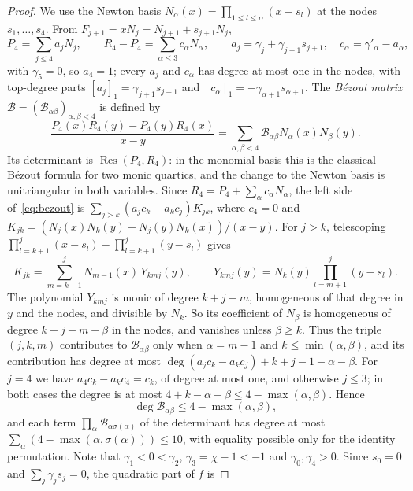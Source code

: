 \documentclass[11pt]{article}
\theoremstyle{definition}
\theoremstyle{remark}
\begin{document}
\begin{proof}
We use the Newton basis $N_\alpha(x)=\prod_{1\le l\le\alpha}(x-s_l)$ at the
nodes $s_1,\dots,s_4$. From $F_{j+1}=xN_j=N_{j+1}+s_{j+1}N_j$,
\[
 P_4=\sum_{j\le4}a_jN_j,\qquad R_4-P_4=\sum_{\alpha\le3}c_\alpha N_\alpha,\qquad
 a_j=\gamma_j+\gamma_{j+1}s_{j+1},\quad c_\alpha=\gamma'_\alpha-a_\alpha,
\]
with $\gamma_5=0$, so $a_4=1$; every $a_j$ and $c_\alpha$ has degree at most one
in the nodes, with top-degree parts $[a_j]_1=\gamma_{j+1}s_{j+1}$ and
$[c_\alpha]_1=-\gamma_{\alpha+1}s_{\alpha+1}$. The \emph{B\'ezout matrix}
$\mathcal B=(\mathcal B_{\alpha\beta})_{\alpha,\beta<4}$ is defined by
\begin{equation}\label{eq:bezout}
 \frac{P_4(x)R_4(y)-P_4(y)R_4(x)}{x-y}
 =\sum_{\alpha,\beta<4}\mathcal B_{\alpha\beta}N_\alpha(x)N_\beta(y).
\end{equation}
Its determinant is $\operatorname{Res}(P_4,R_4)$: in the monomial basis this is
the classical B\'ezout formula for two monic quartics, and the change to the
Newton basis is unitriangular in both variables. Since
$R_4=P_4+\sum_\alpha c_\alpha N_\alpha$, the left side of~\eqref{eq:bezout} is
$\sum_{j>k}(a_jc_k-a_kc_j)K_{jk}$, where $c_4=0$ and
$K_{jk}=(N_j(x)N_k(y)-N_j(y)N_k(x))/(x-y)$. For $j>k$, telescoping
$\prod_{l=k+1}^j(x-s_l)-\prod_{l=k+1}^j(y-s_l)$ gives
\begin{equation}\label{eq:bezoutK}
 K_{jk}=\sum_{m=k+1}^{j}N_{m-1}(x)\,Y_{kmj}(y),\qquad
 Y_{kmj}(y)=N_k(y)\prod_{l=m+1}^{j}(y-s_l).
\end{equation}
The polynomial $Y_{kmj}$ is monic of degree $k+j-m$, homogeneous of that degree
in $y$ and the nodes, and divisible by $N_k$. So its coefficient of $N_\beta$
is homogeneous of degree $k+j-m-\beta$ in the nodes, and vanishes unless
$\beta\ge k$. Thus the triple $(j,k,m)$ contributes to $\mathcal B_{\alpha\beta}$
only when $\alpha=m-1$ and $k\le\min(\alpha,\beta)$, and its contribution has
degree at most $\deg(a_jc_k-a_kc_j)+k+j-1-\alpha-\beta$. For $j=4$ we have
$a_4c_k-a_kc_4=c_k$, of degree at most one, and otherwise $j\le3$; in both cases
the degree is at most $4+k-\alpha-\beta\le4-\max(\alpha,\beta)$. Hence
\begin{equation}\label{eq:bezoutdeg}
 \deg\mathcal B_{\alpha\beta}\le4-\max(\alpha,\beta),
\end{equation}
and each term $\prod_\alpha\mathcal B_{\alpha\sigma(\alpha)}$ of the determinant
has degree at most $\sum_\alpha(4-\max(\alpha,\sigma(\alpha)))\le10$, with
equality possible only for the identity permutation. Note that $\gamma_1<0<\gamma_2$, $\gamma_3=\chi-1<-1$ and
$\gamma_0,\gamma_4>0$. Since $s_0=0$ and $\sum_j\gamma_js_j=0$, the quadratic part of $f$ is

\end{proof}
\end{document}
